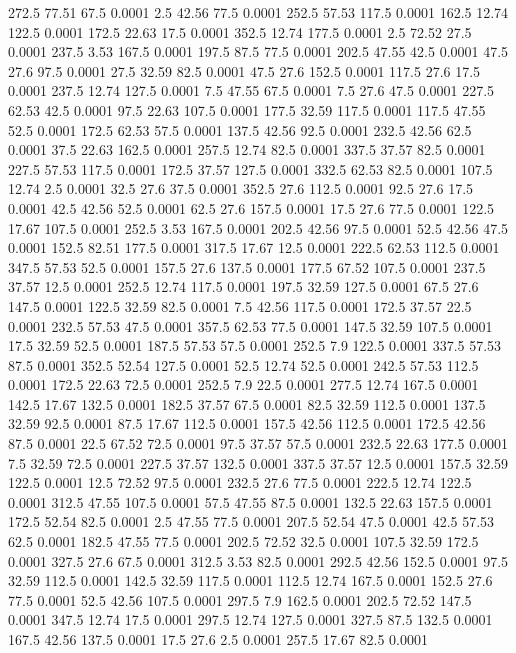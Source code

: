 272.5	77.51	67.5	0.0001
2.5	42.56	77.5	0.0001
252.5	57.53	117.5	0.0001
162.5	12.74	122.5	0.0001
172.5	22.63	17.5	0.0001
352.5	12.74	177.5	0.0001
2.5	72.52	27.5	0.0001
237.5	3.53	167.5	0.0001
197.5	87.5	77.5	0.0001
202.5	47.55	42.5	0.0001
47.5	27.6	97.5	0.0001
27.5	32.59	82.5	0.0001
47.5	27.6	152.5	0.0001
117.5	27.6	17.5	0.0001
237.5	12.74	127.5	0.0001
7.5	47.55	67.5	0.0001
7.5	27.6	47.5	0.0001
227.5	62.53	42.5	0.0001
97.5	22.63	107.5	0.0001
177.5	32.59	117.5	0.0001
117.5	47.55	52.5	0.0001
172.5	62.53	57.5	0.0001
137.5	42.56	92.5	0.0001
232.5	42.56	62.5	0.0001
37.5	22.63	162.5	0.0001
257.5	12.74	82.5	0.0001
337.5	37.57	82.5	0.0001
227.5	57.53	117.5	0.0001
172.5	37.57	127.5	0.0001
332.5	62.53	82.5	0.0001
107.5	12.74	2.5	0.0001
32.5	27.6	37.5	0.0001
352.5	27.6	112.5	0.0001
92.5	27.6	17.5	0.0001
42.5	42.56	52.5	0.0001
62.5	27.6	157.5	0.0001
17.5	27.6	77.5	0.0001
122.5	17.67	107.5	0.0001
252.5	3.53	167.5	0.0001
202.5	42.56	97.5	0.0001
52.5	42.56	47.5	0.0001
152.5	82.51	177.5	0.0001
317.5	17.67	12.5	0.0001
222.5	62.53	112.5	0.0001
347.5	57.53	52.5	0.0001
157.5	27.6	137.5	0.0001
177.5	67.52	107.5	0.0001
237.5	37.57	12.5	0.0001
252.5	12.74	117.5	0.0001
197.5	32.59	127.5	0.0001
67.5	27.6	147.5	0.0001
122.5	32.59	82.5	0.0001
7.5	42.56	117.5	0.0001
172.5	37.57	22.5	0.0001
232.5	57.53	47.5	0.0001
357.5	62.53	77.5	0.0001
147.5	32.59	107.5	0.0001
17.5	32.59	52.5	0.0001
187.5	57.53	57.5	0.0001
252.5	7.9	122.5	0.0001
337.5	57.53	87.5	0.0001
352.5	52.54	127.5	0.0001
52.5	12.74	52.5	0.0001
242.5	57.53	112.5	0.0001
172.5	22.63	72.5	0.0001
252.5	7.9	22.5	0.0001
277.5	12.74	167.5	0.0001
142.5	17.67	132.5	0.0001
182.5	37.57	67.5	0.0001
82.5	32.59	112.5	0.0001
137.5	32.59	92.5	0.0001
87.5	17.67	112.5	0.0001
157.5	42.56	112.5	0.0001
172.5	42.56	87.5	0.0001
22.5	67.52	72.5	0.0001
97.5	37.57	57.5	0.0001
232.5	22.63	177.5	0.0001
7.5	32.59	72.5	0.0001
227.5	37.57	132.5	0.0001
337.5	37.57	12.5	0.0001
157.5	32.59	122.5	0.0001
12.5	72.52	97.5	0.0001
232.5	27.6	77.5	0.0001
222.5	12.74	122.5	0.0001
312.5	47.55	107.5	0.0001
57.5	47.55	87.5	0.0001
132.5	22.63	157.5	0.0001
172.5	52.54	82.5	0.0001
2.5	47.55	77.5	0.0001
207.5	52.54	47.5	0.0001
42.5	57.53	62.5	0.0001
182.5	47.55	77.5	0.0001
202.5	72.52	32.5	0.0001
107.5	32.59	172.5	0.0001
327.5	27.6	67.5	0.0001
312.5	3.53	82.5	0.0001
292.5	42.56	152.5	0.0001
97.5	32.59	112.5	0.0001
142.5	32.59	117.5	0.0001
112.5	12.74	167.5	0.0001
152.5	27.6	77.5	0.0001
52.5	42.56	107.5	0.0001
297.5	7.9	162.5	0.0001
202.5	72.52	147.5	0.0001
347.5	12.74	17.5	0.0001
297.5	12.74	127.5	0.0001
327.5	87.5	132.5	0.0001
167.5	42.56	137.5	0.0001
17.5	27.6	2.5	0.0001
257.5	17.67	82.5	0.0001
